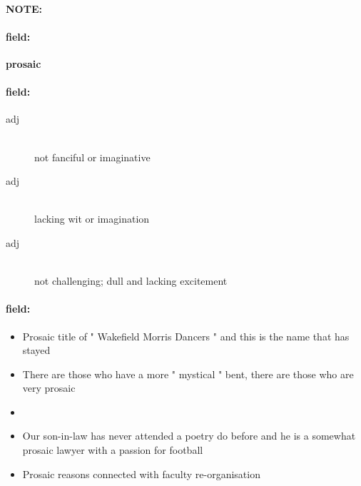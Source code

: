\documentclass[12pt]{article}
\newenvironment{note}{\paragraph{NOTE:}}{}
\newenvironment{field}{\paragraph{field:}}{}
\begin{document}
\begin{note}
\begin{field}
\textbf{\large prosaic}
\end{field}


\begin{field}
\begin{description}
\item[adj] \hfill \\ 
not fanciful or imaginative

\item[adj] \hfill \\ 
lacking wit or imagination

\item[adj] \hfill \\ 
not challenging; dull and lacking excitement

\end{description}
\end{field}

\begin{field}
\begin{itemize}
\item Prosaic title of " Wakefield Morris Dancers " and this is the name that has stayed
\item There are those who have a more " mystical " bent, there are those who are very prosaic
\item 
\item Our son-in-law has never attended a poetry do before and he is a somewhat prosaic lawyer with a passion for football
\item Prosaic reasons connected with faculty re-organisation
\end{itemize}
\end{field}
\end{note}
\end{document}
